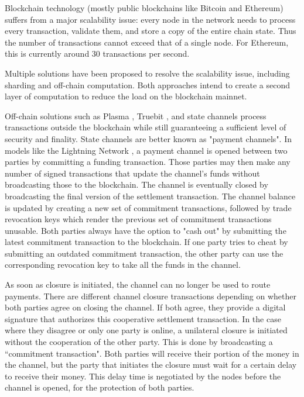 Blockchain technology (mostly public blockchains like Bitcoin and Ethereum) suffers from a major scalability issue: every node in the network needs to process every transaction, validate them, and store a copy of the entire chain state. Thus the number of transactions cannot exceed that of a single node. For Ethereum, this is currently around 30 transactions per second.

Multiple solutions have been proposed to resolve the scalability issue, including sharding and off-chain computation. Both approaches intend to create a second layer of computation to reduce the load on the blockchain mainnet.

Off-chain solutions such as Plasma \cite{plasma}, Truebit \cite{truebit}, and state channels process transactions outside the blockchain while still guaranteeing a sufficient level of security and finality. State channels are better known as "payment channels". In models like the Lightning Network \cite{lightningnetwork}, a payment channel is opened between two parties by committing a funding transaction. Those parties may then make any number of signed transactions that update the channel's funds without broadcasting those to the blockchain. The channel is eventually closed by broadcasting the final version of the settlement transaction. The channel balance is updated by creating a new set of commitment transactions, followed by trade revocation keys which render the previous set of commitment transactions unusable. Both parties always have the option to "cash out" by submitting the latest commitment transaction to the blockchain. If one party tries to cheat by submitting an outdated commitment transaction, the other party can use the corresponding revocation key to take all the funds in the channel.

As soon as closure is initiated, the channel can no longer be used to route payments. There are different channel closure transactions depending on whether both parties agree on closing the channel. If both agree, they provide a digital signature that authorizes this cooperative settlement transaction. In the case where they disagree or only one party is online, a unilateral closure is initiated without the cooperation of the other party. This is done by broadcasting a ``commitment transaction". Both parties will receive their portion of the money in the channel, but the party that initiates the closure must wait for a certain delay to receive their money. This delay time is negotiated by the nodes before the channel is opened, for the protection of both parties.

